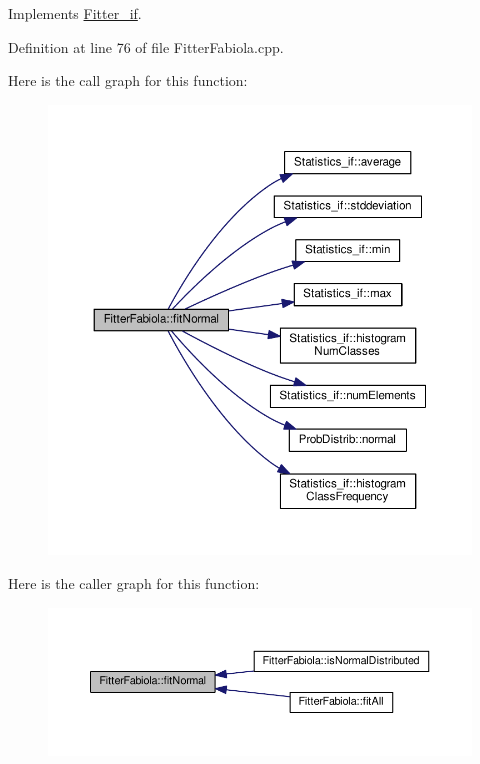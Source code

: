 Implements \hyperlink{class_fitter__if_af95b4de00b7ed5d67b10d9ee458379bf}{Fitter\-\_\-if}.



Definition at line 76 of file Fitter\-Fabiola.\-cpp.



Here is the call graph for this function\-:
\nopagebreak
\begin{figure}[H]
\begin{center}
\leavevmode
\includegraphics[width=350pt]{class_fitter_fabiola_aa1e8d772536e5e3440a0c7207393c82c_cgraph}
\end{center}
\end{figure}




Here is the caller graph for this function\-:
\nopagebreak
\begin{figure}[H]
\begin{center}
\leavevmode
\includegraphics[width=350pt]{class_fitter_fabiola_aa1e8d772536e5e3440a0c7207393c82c_icgraph}
\end{center}
\end{figure}


